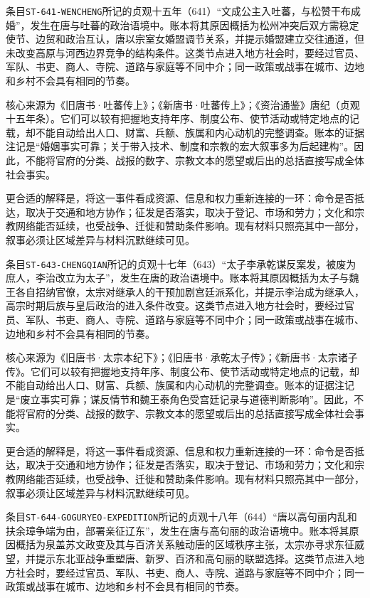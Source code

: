条目\texttt{ST-641-WENCHENG}所记的贞观十五年（641）“文成公主入吐蕃，与松赞干布成婚”，发生在唐与吐蕃的政治语境中。账本将其原因概括为松州冲突后双方需稳定使节、边贸和政治互认，唐以宗室女婚盟调节关系，并提示婚盟建立交往通道，但未改变高原与河西边界竞争的结构条件。这类节点进入地方社会时，要经过官员、军队、书吏、商人、寺院、道路与家庭等不同中介；同一政策或战事在城市、边地和乡村不会具有相同的节奏。

核心来源为《旧唐书·吐蕃传上》；《新唐书·吐蕃传上》；《资治通鉴》唐纪（贞观十五年条）。它们可以较有把握地支持年序、制度公布、使节活动或特定地点的记载，却不能自动给出人口、财富、兵额、族属和内心动机的完整调查。账本的证据注记是“婚姻事实可靠；关于带入技术、制度和宗教的宏大叙事多为后起建构”。因此，不能将官府的分类、战报的数字、宗教文本的愿望或后出的总括直接写成全体社会事实。

更合适的解释是，将这一事件看成资源、信息和权力重新连接的一环：命令是否抵达，取决于交通和地方协作；征发是否落实，取决于登记、市场和劳力；文化和宗教网络能否延续，也受战争、迁徙和赞助条件影响。现有材料只照亮其中一部分，叙事必须让区域差异与材料沉默继续可见。


条目\texttt{ST-643-CHENGQIAN}所记的贞观十七年（643）“太子李承乾谋反案发，被废为庶人，李治改立为太子”，发生在唐的政治语境中。账本将其原因概括为太子与魏王各自招纳官僚，太宗对继承人的干预加剧宫廷派系化，并提示李治成为继承人，高宗时期后族与皇后政治的进入条件改变。这类节点进入地方社会时，要经过官员、军队、书吏、商人、寺院、道路与家庭等不同中介；同一政策或战事在城市、边地和乡村不会具有相同的节奏。

核心来源为《旧唐书·太宗本纪下》；《旧唐书·承乾太子传》；《新唐书·太宗诸子传》。它们可以较有把握地支持年序、制度公布、使节活动或特定地点的记载，却不能自动给出人口、财富、兵额、族属和内心动机的完整调查。账本的证据注记是“废立事实可靠；谋反情节和魏王泰角色受宫廷记录与道德判断影响”。因此，不能将官府的分类、战报的数字、宗教文本的愿望或后出的总括直接写成全体社会事实。

更合适的解释是，将这一事件看成资源、信息和权力重新连接的一环：命令是否抵达，取决于交通和地方协作；征发是否落实，取决于登记、市场和劳力；文化和宗教网络能否延续，也受战争、迁徙和赞助条件影响。现有材料只照亮其中一部分，叙事必须让区域差异与材料沉默继续可见。


条目\texttt{ST-644-GOGURYEO-EXPEDITION}所记的贞观十八年（644）“唐以高句丽内乱和扶余璋争端为由，部署亲征辽东”，发生在唐与高句丽的政治语境中。账本将其原因概括为泉盖苏文政变及其与百济关系触动唐的区域秩序主张，太宗亦寻求东征威望，并提示东北亚战争重塑唐、新罗、百济和高句丽的联盟选择。这类节点进入地方社会时，要经过官员、军队、书吏、商人、寺院、道路与家庭等不同中介；同一政策或战事在城市、边地和乡村不会具有相同的节奏。

